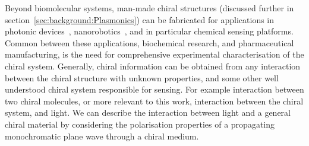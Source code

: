 Beyond biomolecular systems, man-made chiral structures (discussed further in section~\ref{sec:background:Plasmonics}) can be fabricated for applications in photonic devices~\cite{Rizza2015, Esposito2016, Hou2016}, nanorobotics~\cite{Urban2015, Schamel2013a}, and in particular chemical sensing platforms. Common between these applications, biochemical research, and pharmaceutical manufacturing, is the need for comprehensive experimental characterisation of the chiral system. Generally, chiral information can be obtained from any interaction between the chiral structure with unknown properties, and some other well understood chiral system responsible for sensing. For example interaction between two chiral molecules, or more relevant to this work, interaction between the chiral system, and light. We can describe the interaction between light and a general chiral material by considering the polarisation properties of a propagating monochromatic plane wave through a chiral medium.

